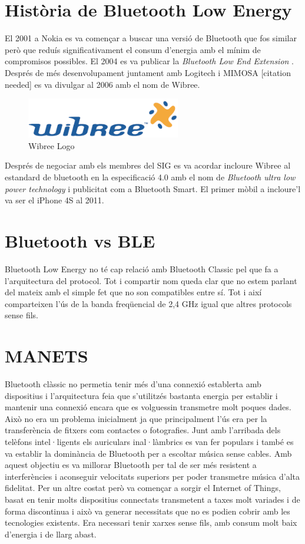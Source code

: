 \section{Història de Bluetooth Low Energy}
El 2001 a Nokia es va començar a buscar una versió de Bluetooth que fos similar però que reduís significativament el consum d'energia amb el mínim de compromisos possibles.
El 2004 es va publicar la \textit{Bluetooth Low End Extension} \cite{Original_BLE_Extension}. 
Després de més desenvolupament juntament amb Logitech i MIMOSA [citation needed] es va divulgar al 2006 amb el nom de Wibree.

\begin{figure}[h]
	\begin{center}
		\includegraphics[width=0.6\textwidth]{./images/Wibree_Logo.png}
		\caption{Wibree Logo}
	\end{center}
\end{figure}

Després de negociar amb els membres del SIG es va acordar incloure Wibree al estandard de bluetooth en la especificació 4.0 amb el nom de \textit{Bluetooth ultra low power technology} i publicitat com a Bluetooth Smart. El primer mòbil a incloure'l va ser el iPhone 4S al 2011.

\section{Bluetooth vs BLE}
Bluetooth Low Energy no té cap relació amb Bluetooth Classic pel que fa a l'arquitectura del protocol. Tot i compartir nom queda clar que no estem parlant del mateix amb el simple fet que no son compatibles entre sí. Tot i així comparteixen l'ús de la banda freqüencial de 2,4 GHz igual que altres protocols sense fils.


\section{MANETS}
Bluetooth clàssic no permetia tenir més d'una connexió establerta amb dispositius i l'arquitectura feia que s'utilitzés bastanta energia per establir i mantenir una connexió encara que es volguessin transmetre molt poques dades.
Això no era un problema inicialment ja que principalment l'ús era per la transferència de fitxers com contactes o fotografies.
Junt amb l'arribada dels telèfons intel·ligents els auriculars inal·làmbrics es van fer populars i també es va establir la dominància de Bluetooth per a escoltar música sense cables.
Amb aquest objectiu es va millorar Bluetooth per tal de ser més resistent a interferències i aconseguir velocitats superiors per poder transmetre música d'alta fidelitat.
Per un altre costat però va començar a sorgir el Internet of Things, basat en tenir molts dispositius connectats transmetent a taxes molt variades i de forma discontinua i això va generar necessitats que no es podien cobrir amb les tecnologies existents.
Era necessari tenir xarxes sense fils, amb consum molt baix d'energia i de llarg abast.

